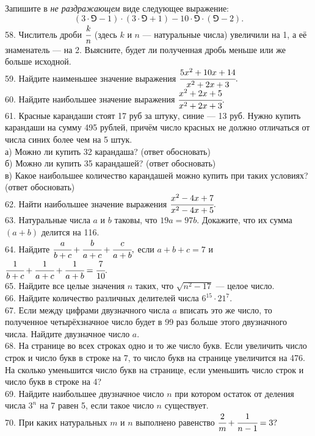 \documentclass[12pt]{article}
\begin{document}
Запишите в {\it не раздражающем} виде следующее выражение:
$$(3\cdot\Game-1)\cdot(3\cdot\Game+1)-10\cdot\Game\cdot(\Game-2).$$
58. Числитель дроби $\cfrac{k}{n}$ (здесь $k$ и $n$ --- натуральные числа) увеличили на 1, а её знаменатель --- на 2. Выясните, будет ли полученная дробь меньше или же больше исходной.\\
59. Найдите наименьшее значение выражения $\cfrac{5x^2+10x+14}{x^2+2x+3}.$\\
60. Найдите наибольшее значение выражения $\cfrac{x^2+2x+5}{x^2+2x+3}.$\\
61. Красные карандаши стоят 17 руб за штуку, синие --- 13 руб. Нужно купить карандаши на сумму 495 рублей, причём число красных не должно отличаться от числа синих более чем на 5 штук.\\
а) Можно ли купить 32 карандаша? (ответ обосновать)\\
б) Можно ли купить 35 карандашей? (ответ обосновать)\\
в) Какое наибольшее количество карандашей можно купить при таких условиях? (ответ обосновать)\\
62. Найти наибольшее значение выражения $\cfrac{x^2-4x+7}{x^2-4x+5}.$\\
63. Натуральные числа $a$ и $b$ таковы, что $19a=97b.$ Докажите, что их сумма $(a+b)$ делится на 116.\\
64. Найдите $\cfrac{a}{b+c}+\cfrac{b}{a+c}+\cfrac{c}{a+b},$ если $a+b+c=7$ и $\cfrac{1}{b+c}+\cfrac{1}{a+c}+\cfrac{1}{a+b}=\cfrac{7}{10}.$\\
65. Найдите все целые значения $n$ таких, что $\sqrt{n^2-17}$ --- целое число.\\
66. Найдите количество различных делителей числа $6^{15}\cdot21^{7}.$\\
67. Если между цифрами двузначного числа $a$ вписать это же число, то полученное четырёхзначное число будет в 99 раз больше этого двузначного числа. Найдите двузначное число $a.$\\
68. На странице во всех строках одно и то же число букв. Если увеличить число строк и число букв в строке на 7, то число букв на странице увеличится на 476. На сколько уменьшится число букв на странице, если уменьшить число строк и число букв в строке на 4?\\
69. Найдите наибольшее двузначное число $n$ при котором остаток от деления числа $3^n$ на 7 равен 5, если такое число $n$ существует.\\
70. При каких натуральных $m$ и $n$ выполнено равенство $\cfrac{2}{m}+\cfrac{1}{n-1}=3?$\\
\end{document}

